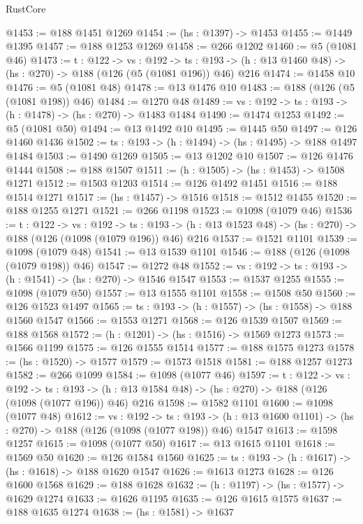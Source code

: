 \begin{lexlean}{RustCore}
\begin{coremodule}
@1453 := @188 @1451 @1269
@1454 := (hs : @1397) -> @1453
@1455 := @1449 @1395
@1457 := @188 @1253 @1269
@1458 := @266 @1202
@1460 := @5 (@1081 @46)
@1473 := {t : @122} ->
  {vs : @192} ->
  {ts : @193} -> (h : @13 @1460 @48) -> (hs : @270) -> @188 (@126 (@5 (@1081 @196)) @46) @216
@1474 := @1458 @10
@1476 := @5 (@1081 @48)
@1478 := @13 @1476 @10
@1483 := @188 (@126 (@5 (@1081 @198)) @46)
@1484 := @1270 @48
@1489 := {vs : @192} -> {ts : @193} -> (h : @1478) -> (hs : @270) -> @1483 @1484
@1490 := @1474 @1253
@1492 := @5 (@1081 @50)
@1494 := @13 @1492 @10
@1495 := @1445 @50
@1497 := @126 @1460 @1436
@1502 := {ts : @193} -> (h : @1494) -> (hs : @1495) -> @188 @1497 @1484
@1503 := @1490 @1269
@1505 := @13 @1202 @10
@1507 := @126 @1476 @1444
@1508 := @188 @1507
@1511 := (h : @1505) -> (hs : @1453) -> @1508 @1271
@1512 := @1503 @1203
@1514 := @126 @1492 @1451
@1516 := @188 @1514 @1271
@1517 := (hs : @1457) -> @1516
@1518 := @1512 @1455
@1520 := @188 @1255 @1271
@1521 := @266 @1198
@1523 := @1098 (@1079 @46)
@1536 := {t : @122} ->
  {vs : @192} ->
  {ts : @193} -> (h : @13 @1523 @48) -> (hs : @270) -> @188 (@126 (@1098 (@1079 @196)) @46) @216
@1537 := @1521 @1101
@1539 := @1098 (@1079 @48)
@1541 := @13 @1539 @1101
@1546 := @188 (@126 (@1098 (@1079 @198)) @46)
@1547 := @1272 @48
@1552 := {vs : @192} -> {ts : @193} -> (h : @1541) -> (hs : @270) -> @1546 @1547
@1553 := @1537 @1255
@1555 := @1098 (@1079 @50)
@1557 := @13 @1555 @1101
@1558 := @1508 @50
@1560 := @126 @1523 @1497
@1565 := {ts : @193} -> (h : @1557) -> (hs : @1558) -> @188 @1560 @1547
@1566 := @1553 @1271
@1568 := @126 @1539 @1507
@1569 := @188 @1568
@1572 := (h : @1201) -> (hs : @1516) -> @1569 @1273
@1573 := @1566 @1199
@1575 := @126 @1555 @1514
@1577 := @188 @1575 @1273
@1578 := (hs : @1520) -> @1577
@1579 := @1573 @1518
@1581 := @188 @1257 @1273
@1582 := @266 @1099
@1584 := @1098 (@1077 @46)
@1597 := {t : @122} ->
  {vs : @192} ->
  {ts : @193} -> (h : @13 @1584 @48) -> (hs : @270) -> @188 (@126 (@1098 (@1077 @196)) @46) @216
@1598 := @1582 @1101
@1600 := @1098 (@1077 @48)
@1612 := {vs : @192} ->
  {ts : @193} -> (h : @13 @1600 @1101) -> (hs : @270) -> @188 (@126 (@1098 (@1077 @198)) @46) @1547
@1613 := @1598 @1257
@1615 := @1098 (@1077 @50)
@1617 := @13 @1615 @1101
@1618 := @1569 @50
@1620 := @126 @1584 @1560
@1625 := {ts : @193} -> (h : @1617) -> (hs : @1618) -> @188 @1620 @1547
@1626 := @1613 @1273
@1628 := @126 @1600 @1568
@1629 := @188 @1628
@1632 := (h : @1197) -> (hs : @1577) -> @1629 @1274
@1633 := @1626 @1195
@1635 := @126 @1615 @1575
@1637 := @188 @1635 @1274
@1638 := (hs : @1581) -> @1637

\end{coremodule}
\end{lexlean}
